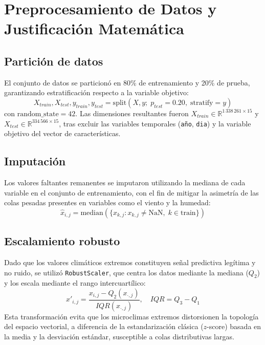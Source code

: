\section{Preprocesamiento de Datos y Justificación Matemática}\label{sec:preprocessing}
 
\subsection{Partición de datos}
El conjunto de datos se particionó en 80\% de entrenamiento y 20\% de prueba, garantizando estratificación respecto a la variable objetivo:
\begin{equation}
X_{train}, X_{test}, y_{train}, y_{test} = \text{split}(X, y; \; p_{test}=0.20, \; \text{stratify}=y)
\label{eq:split}
\end{equation}
con $\text{random\_state}=42$. Las dimensiones resultantes fueron $X_{train} \in \mathbb{R}^{1\,338\,261 \times 15}$ y $X_{test} \in \mathbb{R}^{334\,566 \times 15}$, tras excluir las variables temporales (\texttt{año}, \texttt{dia}) y la variable objetivo del vector de características.
 
\subsection{Imputación}
Los valores faltantes remanentes se imputaron utilizando la mediana de cada variable en el conjunto de entrenamiento, con el fin de mitigar la asimetría de las colas pesadas presentes en variables como el viento y la humedad:
\begin{equation}
\hat{x}_{i,j} = \text{median}\left(\{x_{k,j} : x_{k,j} \neq \text{NaN}, \; k \in \text{train}\}\right)
\label{eq:median}
\end{equation}
 
\subsection{Escalamiento robusto}
Dado que los valores climáticos extremos constituyen señal predictiva legítima y no ruido, se utilizó \texttt{RobustScaler}, que centra los datos mediante la mediana ($Q_2$) y los escala mediante el rango intercuartílico:
\begin{equation}
x'_{i,j} = \frac{x_{i,j} - Q_2(x_{\cdot,j})}{IQR(x_{\cdot,j})}, \quad IQR = Q_3 - Q_1
\label{eq:robust}
\end{equation}
Esta transformación evita que los microclimas extremos distorsionen la topología del espacio vectorial, a diferencia de la estandarización clásica ($z$-score) basada en la media y la desviación estándar, susceptible a colas distributivas largas.
 
